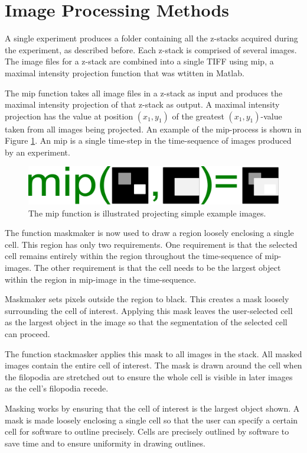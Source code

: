 \documentclass[ twocolumn,notitlepage]{ revtex4-1}
\begin{document}
\section*{Image Processing Methods}
A single experiment produces a folder containing all the z-stacks acquired during the experiment, as described before. Each z-stack is comprised of several images. The image files for a z-stack are combined into a single TIFF using mip, a maximal intensity projection function that was wtitten in Matlab.

The mip function takes all image files in a z-stack as input and produces the maximal intensity projection of that z-stack as output. A maximal intensity projection has the value at position $(x_1,y_1)$ of the greatest $(x_1,y_1)$-value taken from all images being projected. An example of the mip-process is shown in Figure \ref{fig:mip-illustration}. An mip is a single time-step in the time-sequence of images produced by an experiment.

\begin{figure}[!h]
\includegraphics[width=.4\textwidth]{./img/mip-illustration.pdf}
\caption{The mip function is illustrated projecting simple example images.}
\label{fig:mip-illustration}
\end{figure}

The function maskmaker is now used to draw a region loosely enclosing a single cell. This region has only two requirements. One requirement is that the selected cell remains entirely within the region throughout the time-sequence of mip-images. The other requirement is that the cell needs to be the largest object within the region in mip-image in the time-sequence.

Maskmaker sets pixels outside the region to black. This creates a mask loosely surrounding the cell of interest. Applying this mask leaves the user-selected cell as the largest object in the image so that the segmentation of the selected cell can proceed. 

The function stackmasker applies this mask to all images in the stack. All masked images contain the entire cell of interest. The mask is drawn around the cell when the filopodia are stretched out to ensure the whole cell is visible in later images as the cell's filopodia recede.

Masking works by ensuring that the cell of interest is the largest object shown. A mask is made loosely enclosing a single cell so that the user can specify a certain cell for software to outline precisely. Cells are precisely outlined by software to save time and to ensure uniformity in drawing outlines.
\end{document}
